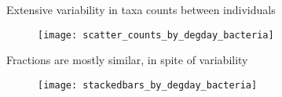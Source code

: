 \documentclass{beamer}
\begin{document}
\begin{frame}{Extensive variability in taxa counts between individuals}

\begin{center}
\begin{figure}
  \texttt{[image: scatter\_counts\_by\_degday\_bacteria]}
\end{figure}
\end{center}

\end{frame}


\begin{frame}{Fractions are mostly similar, in spite of variability}

\begin{center}
\begin{figure}
  \texttt{[image: stackedbars\_by\_degday\_bacteria]}
\end{figure}
\end{center}

\end{frame}







\end{document}
